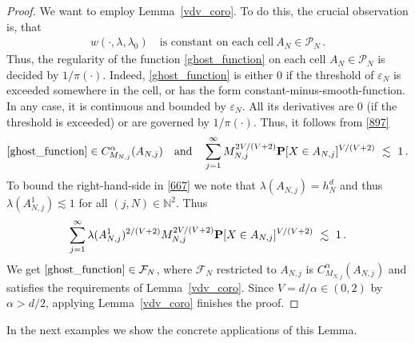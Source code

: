 \begin{proof}
  We want to employ Lemma~\ref{vdv_coro}. 
  To do this, the crucial observation is, that
  \begin{gather*}
    w(\cdot,\lambda,\lambda_0)
    \quad
    \text{is constant on each cell}\ 
    A_N\in\mathcal{P}_N
    \,.
  \end{gather*}
  Thus, the regularity of the function \eqref{ghost_function}
  on each cell $A_N\in\mathcal{P}_N$ is decided by 
  $1/\pi(\cdot)$.
  Indeed, \eqref{ghost_function} is either 0 if the threshold of $\varepsilon_N$ is exceeded somewhere in the cell, or has the form constant-minus-smooth-function.
In any case, it is continuous and bounded by $\varepsilon_N$.
All its derivatives are 0 (if the threshold is exceeded) or are governed by $1/\pi(\cdot)$.
Thus, it follows from \eqref{897}
\begin{gather}
  \eqref{ghost_function}
  \in C^\alpha_{M_{N,j}}(A_{N,j})
  \quad
  \text{and}
  \quad
  \sum_{j=1}^{\infty} 
  M_{N,j}^{2V/(V+2)}
  \P
  [
  X\in A_{N,j}
  ]^{V/(V+2)}
  \ 
  \lesssim
  \ 
  1
  \,.
\end{gather}
To bound the right-hand-side in \eqref{667} we note
that 
$
\lambda(A_{N,j})=h^d_N
$ 
and thus
$
\lambda(A_{N,j}^1)\lesssim 1
$
for all $(j,N)\in\mathbb{N}^2$.
Thus
\begin{gather*}
  \sum_{j=1}^{\infty} 
  \lambda(A_{N,j}^1)^{2/(V+2)}
  M_{N,j}^{2V/(V+2)}
  \P
  [
  X\in A_{N,j}
  ]^{V/(V+2)}
  \ 
  \lesssim
  \ 
  1
  \,.
\end{gather*}
We get $\eqref{ghost_function}\in\mathcal{F}_N$, where 
$
\mathcal{F}_N
$
restricted to $A_{N,j}$ is 
$
  C^\alpha_{M_{N,j}}(A_{N,j})
$
and satisfies the requirements of Lemma~\ref{vdv_coro}.
Since $V=d/\alpha \in (0,2)$ by $\alpha>d/2$, 
applying Lemma~\ref{vdv_coro} finishes the proof.
\end{proof}
In the next examples we show the concrete applications of this Lemma.
